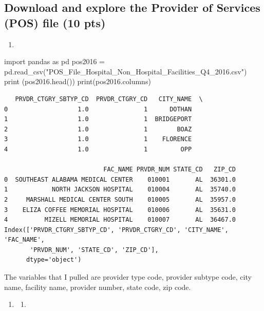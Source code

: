 \documentclass[
  letterpaper,
  DIV=11,
  numbers=noendperiod]{scrartcl}
\newenvironment{Shaded}{\begin{snugshade}}{\end{snugshade}}
\newcommand{\BuiltInTok}[1]{\textcolor[rgb]{0.00,0.23,0.31}{#1}}
\newcommand{\ImportTok}[1]{\textcolor[rgb]{0.00,0.46,0.62}{#1}}
\newcommand{\NormalTok}[1]{\textcolor[rgb]{0.00,0.23,0.31}{#1}}
\newcommand{\OperatorTok}[1]{\textcolor[rgb]{0.37,0.37,0.37}{#1}}
\newcommand{\StringTok}[1]{\textcolor[rgb]{0.13,0.47,0.30}{#1}}
\providecommand{\tightlist}{%
  \setlength{\itemsep}{0pt}\setlength{\parskip}{0pt}}\usepackage{longtable,booktabs,array}
\begin{document}
\subsection{Download and explore the Provider of Services (POS) file (10
pts)}\label{download-and-explore-the-provider-of-services-pos-file-10-pts}

\begin{enumerate}
\def\labelenumi{\arabic{enumi}.}
\tightlist
\item
\end{enumerate}

\begin{Shaded}
\begin{Highlighting}[]
\ImportTok{import}\NormalTok{ pandas }\ImportTok{as}\NormalTok{ pd}
\NormalTok{pos2016 }\OperatorTok{=}\NormalTok{ pd.read\_csv(}\StringTok{"POS\_File\_Hospital\_Non\_Hospital\_Facilities\_Q4\_2016.csv"}\NormalTok{)}
\BuiltInTok{print}\NormalTok{ (pos2016.head())}
\BuiltInTok{print}\NormalTok{(pos2016.columns)}
\end{Highlighting}
\end{Shaded}

\begin{verbatim}
   PRVDR_CTGRY_SBTYP_CD  PRVDR_CTGRY_CD   CITY_NAME  \
0                   1.0               1      DOTHAN   
1                   1.0               1  BRIDGEPORT   
2                   1.0               1        BOAZ   
3                   1.0               1    FLORENCE   
4                   1.0               1         OPP   

                           FAC_NAME PRVDR_NUM STATE_CD   ZIP_CD  
0  SOUTHEAST ALABAMA MEDICAL CENTER    010001       AL  36301.0  
1            NORTH JACKSON HOSPITAL    010004       AL  35740.0  
2     MARSHALL MEDICAL CENTER SOUTH    010005       AL  35957.0  
3    ELIZA COFFEE MEMORIAL HOSPITAL    010006       AL  35631.0  
4          MIZELL MEMORIAL HOSPITAL    010007       AL  36467.0  
Index(['PRVDR_CTGRY_SBTYP_CD', 'PRVDR_CTGRY_CD', 'CITY_NAME', 'FAC_NAME',
       'PRVDR_NUM', 'STATE_CD', 'ZIP_CD'],
      dtype='object')
\end{verbatim}

The variables that I pulled are provider type code, provider subtype
code, city name, facility name, provider number, state code, zip code.

\begin{enumerate}
\def\labelenumi{\arabic{enumi}.}
\setcounter{enumi}{1}
\tightlist
\item
  \begin{enumerate}
  \def\labelenumii{\alph{enumii}.}
  \tightlist
  \item
  \end{enumerate}
\end{enumerate}
\end{document}

